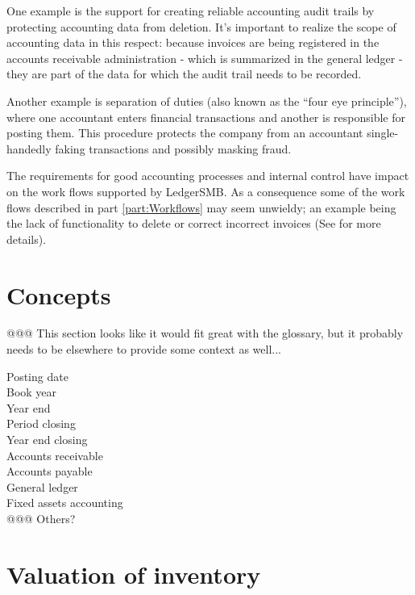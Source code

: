 One example is the support for creating reliable accounting audit trails
by protecting accounting data from deletion. It's important to realize the scope
of accounting data in this respect: because invoices are being registered in the
accounts receivable administration - which is summarized in the general ledger -
they are part of the data for which the audit trail needs to be recorded.

Another example is separation of duties (also known as the ``four eye principle''),
where one accountant enters financial transactions and another is responsible for
posting them. This procedure protects the company from an accountant single-handedly
faking transactions and possibly masking fraud.

The requirements for good accounting processes and internal control have impact
on the work flows supported by LedgerSMB. As a consequence some of the work flows
described in part \ref{part:Workflows} may seem unwieldy; an example being the
lack of functionality to delete or correct incorrect invoices (See  for more details).


\section{Concepts}

@@@ This section looks like it would fit great with the glossary, but it probably needs
to be elsewhere to provide some context as well...

\begin{description}
\item [Posting date]
\item [Book year]
\item [Year end]
\item [Period closing]
\item [Year end closing]
\item [Accounts receivable]
\item [Accounts payable]
\item [General ledger]
\item [Fixed assets accounting]
\item [@@@ Others?]
\end{description}

\section{Valuation of inventory}




